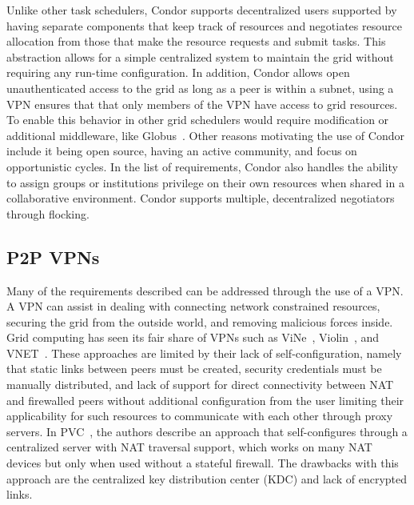 \documentclass{sig-alternate}
\begin{document}
Unlike other task schedulers, Condor supports decentralized users supported
by having separate
components that keep track of resources and negotiates resource allocation from
those that make the resource requests and submit tasks.  This abstraction
allows for a simple centralized system to maintain the grid without requiring
any run-time configuration.  In addition, Condor allows open unauthenticated
access to the grid as long as a peer is within a subnet, using a VPN ensures
that that only members of the VPN have access to grid resources.  To enable this
behavior in other grid schedulers would require modification or additional
middleware, like Globus~\cite{globus_toolkit}.  Other reasons motivating the
use of Condor include it being open source, having an active community, and
focus on opportunistic cycles.  In the list of requirements, Condor also
handles the ability to assign groups or institutions privilege on their own
resources when shared in a collaborative environment.  Condor supports
multiple, decentralized negotiators through flocking.


\subsection{P2P VPNs}
Many of the requirements described can be addressed through the use of a
VPN.  A VPN can assist in dealing with connecting network constrained resources,
securing the grid from the outside world, and removing malicious forces inside.
Grid computing has seen its fair share of VPNs such as ViNe~\cite{vine},
Violin~\cite{violin}, and VNET~\cite{vnet}.  These approaches are limited by
their lack of self-configuration, namely that static links between peers must
be created, security credentials must be manually distributed, and lack of
support for direct connectivity between NAT and firewalled peers without
additional configuration from the user limiting their applicability for such
resources to communicate with each other through proxy servers.  In
PVC~\cite{pvc}, the authors describe an approach that self-configures through
a centralized server with NAT traversal support, which works on many
NAT devices but only when used without a stateful firewall.  The drawbacks with
this approach are the centralized key distribution center (KDC) and lack of
encrypted links.
\end{document}
